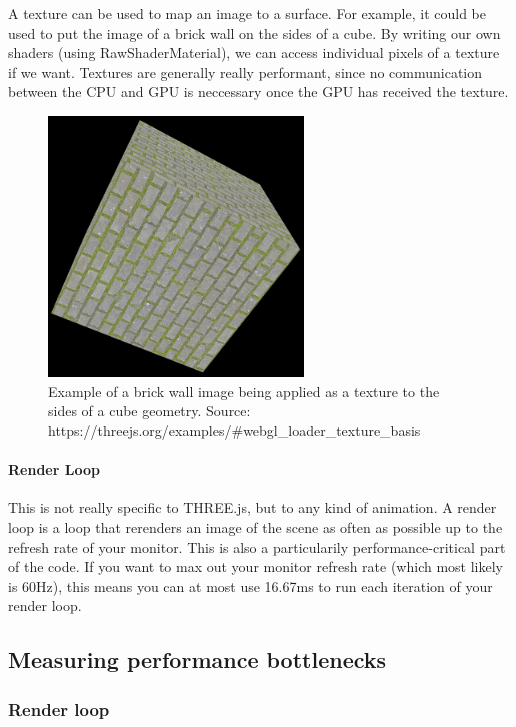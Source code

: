 A texture can be used to map an image to a surface. For example, it
could be used to put the image of a brick wall on the sides of a cube.
By writing our own shaders (using RawShaderMaterial), we can access
individual pixels of a texture if we want. Textures are generally really
performant, since no communication between the CPU and GPU is neccessary
once the GPU has received the texture.

\begin{figure}
\centering
\includegraphics[width=2.66667in,height=\textheight]{./texture-example.png}
\caption{Example of a brick wall image being applied as a texture to the
sides of a cube geometry. Source:
https://threejs.org/examples/\#webgl\_loader\_texture\_basis}
\end{figure}

\hypertarget{render-loop}{%
\paragraph{Render Loop}\label{render-loop}}

This is not really specific to THREE.js, but to any kind of animation. A
render loop is a loop that rerenders an image of the scene as often as
possible up to the refresh rate of your monitor. This is also a
particularily performance-critical part of the code. If you want to max
out your monitor refresh rate (which most likely is 60Hz), this means
you can at most use 16.67ms to run each iteration of your render loop.

\hypertarget{measuring-performance-bottlenecks}{%
\subsection{Measuring performance
bottlenecks}\label{measuring-performance-bottlenecks}}

\hypertarget{render-loop-1}{%
\subsubsection{Render loop}\label{render-loop-1}}

